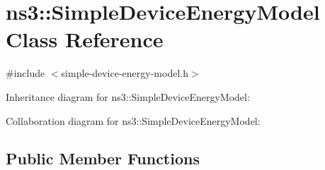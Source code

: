 \hypertarget{classns3_1_1SimpleDeviceEnergyModel}{}\section{ns3\+:\+:Simple\+Device\+Energy\+Model Class Reference}
\label{classns3_1_1SimpleDeviceEnergyModel}


{\ttfamily \#include $<$simple-\/device-\/energy-\/model.\+h$>$}



Inheritance diagram for ns3\+:\+:Simple\+Device\+Energy\+Model\+:


Collaboration diagram for ns3\+:\+:Simple\+Device\+Energy\+Model\+:
\subsection*{Public Member Functions}
